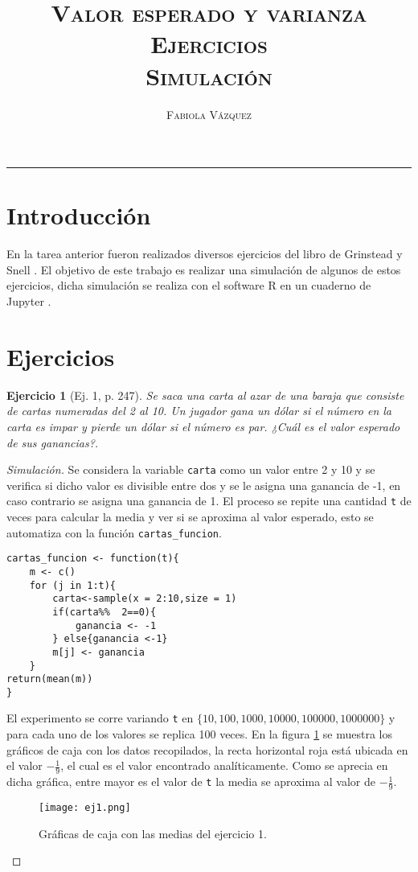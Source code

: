 \documentclass[12pt,letterpaper]{article}
\title{\textsc{Valor esperado y varianza \\ Ejercicios \\ Simulación}}
\author{\textsc{Fabiola Vázquez}}
\newtheorem{ej}{Ejercicio}
\begin{document}
\maketitle
\hrule
\section{Introducción}
En la tarea anterior \cite{fab} fueron realizados diversos ejercicios del libro de Grinstead y Snell \cite{snell}. El objetivo de este trabajo es realizar una simulación de algunos de estos ejercicios, dicha simulación se realiza con el software R \cite{R} en un cuaderno de Jupyter \cite{jupyter}.
\section{Ejercicios}

\begin{ej}[Ej. 1, p. 247] 
Se saca una carta al azar de una baraja que consiste de cartas numeradas del 2 al 10. Un jugador gana un dólar si el número en la carta es impar y pierde un dólar si el número es par. ¿Cuál es el valor esperado de sus ganancias?.
\end{ej}
\begin{proof}[Simulación]
Se considera la variable \texttt{carta} como un valor entre 2 y 10 y se verifica si dicho valor es divisible entre dos y se le asigna una ganancia de -1, en caso contrario se asigna una ganancia de 1. El proceso se repite una cantidad \texttt{t} de veces para calcular la media y ver si se aproxima al valor esperado, esto se automatiza con la función \texttt{cartas\_funcion}.
\begin{lstlisting}
cartas_funcion <- function(t){
    m <- c()
    for (j in 1:t){
		carta<-sample(x = 2:10,size = 1)
        if(carta%%  2==0){
            ganancia <- -1
        } else{ganancia <-1}
        m[j] <- ganancia
    }
return(mean(m))   
}
\end{lstlisting}
El experimento se corre variando \texttt{t} en $\{10, 100, 1000, 10000, 100000, 1000000\}$ y para cada uno de los valores se replica 100 veces. En la figura \ref{ej1} se muestra los gráficos de caja con los datos recopilados, la recta horizontal roja está ubicada en el valor $-\frac{1}{9}$, el cual es el valor encontrado analíticamente. Como se aprecia en dicha gráfica, entre mayor es el valor de \texttt{t} la media se aproxima al valor de $-\frac{1}{9}$.
\begin{figure}
 	\centering 
 		\texttt{[image: ej1.png]} 		
 	 	\caption{Gráficas de caja con las medias del ejercicio 1.} 
 	 		\label{ej1}
\end{figure}

\end{proof}
\end{document}
